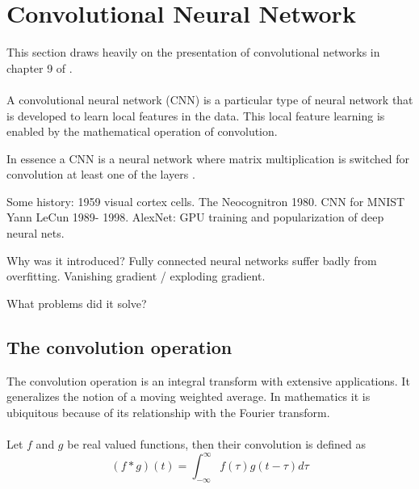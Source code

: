 \documentclass[../../thesis.tex]{subfiles}
\begin{document}
\section{Convolutional Neural Network}
This section draws heavily on the presentation of convolutional networks in chapter 9 of \cite{deeplearningbook}.\\\\

A convolutional neural network (CNN) is a particular type of neural network that is developed to learn local features in the data. This local feature learning is enabled by the mathematical operation of convolution. 

In essence a CNN is a neural network where matrix multiplication is switched for convolution at least one of the layers \cite{deeplearningbook}. 

Some history: 1959 visual cortex cells. The Neocognitron 1980. CNN for MNIST Yann LeCun 1989- 1998. AlexNet: GPU training and popularization of deep neural nets.

Why was it introduced? 
Fully connected neural networks suffer badly from overfitting. Vanishing gradient / exploding gradient.

What problems did it solve?

\subsection{The convolution operation}

The convolution operation is an integral transform with extensive applications. It generalizes the notion of a moving weighted average. In mathematics it is ubiquitous because of its relationship with the Fourier transform.
\\\\
Let $f$ and $g$ be real valued functions, then their convolution is defined as
\begin{equation}
    (f*g)(t) = \int_{-\infty}^{\infty} f(\tau)g(t-\tau) d\tau
\end{equation}
\end{document}
